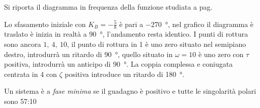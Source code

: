\newpage
Si riporta il diagramma in frequenza della funzione studiata a pag.
\pageref{sec:Esercizio_bode}
\begin{figure}[h]
\centering
{}
\end{figure}
Lo sfasamento iniziale con $K_B=-\frac{5}{8}$ è pari a \SI{-270}{\degree}, nel
grafico il diagramma è traslato è inizia in realtà a \SI{90}{\degree},
l'andamento resta identico. I punti di rottura sono ancora $1,\ 4,\ 10$, il
punto di rottura in 1 è uno zero situato nel semipiano destro, introdurrà un
ritardo di \SI{90}{\degree}, quello situato in $\omega=10$ è uno zero con
$\tau$ positiva, introdurrà un anticipo di \SI{90}{\degree}.
La coppia complessa e coniugata centrata in 4 con $\zeta$ positiva introduce un
ritardo di \SI{180}{\degree}.

Un sistema è a \textit{fase minima} se il guadagno è positivo e tutte le
singolarità polari sono 57:10
